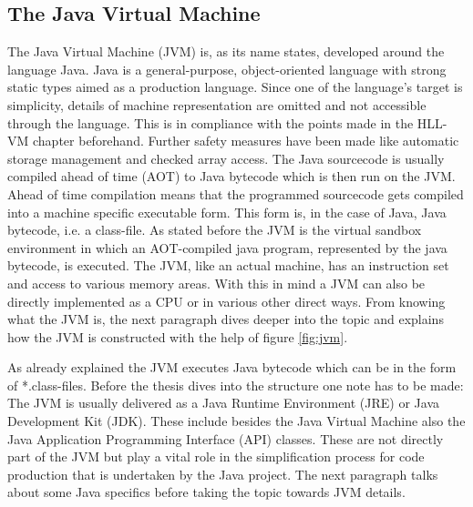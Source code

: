 \subsection{The Java Virtual Machine}
The Java Virtual Machine (JVM) is, as its name states, developed around the language Java. Java is a general-purpose, object-oriented language with strong static types aimed as a production language. \cite{Gosling} Since one of the language's target is simplicity, details of machine representation are omitted and not accessible through the language. This is in compliance with the points made in the HLL-VM chapter beforehand. Further safety measures have been made like automatic storage management and checked array access. The Java sourcecode is usually compiled ahead of time (AOT) to Java bytecode which is then run on the JVM. Ahead of time compilation means that the programmed sourcecode gets compiled into a machine specific executable form. This form is, in the case of Java, Java bytecode, i.e. a class-file.\cite{Gosling} As stated before the JVM is the virtual sandbox environment in which an AOT-compiled java program, represented by the java bytecode, is executed. The JVM, like an actual machine, has an instruction set and access to various memory areas. With this in mind a JVM can also be directly implemented as a CPU or in various other direct ways. From knowing what the JVM is, the next paragraph dives deeper into the topic and explains how the JVM is constructed with the help of figure \ref{fig:jvm}.

As already explained the JVM executes Java bytecode which can be in the form of *.class-files. Before the thesis dives into the structure one note has to be made: The JVM is usually delivered as a Java Runtime Environment (JRE) or Java Development Kit (JDK). These include besides the Java Virtual Machine also the Java Application Programming Interface (API) classes. These are not directly part of the JVM but play a vital role in the simplification process for code production that is undertaken by the Java project. The next paragraph talks about some Java specifics before taking the topic towards JVM details.


